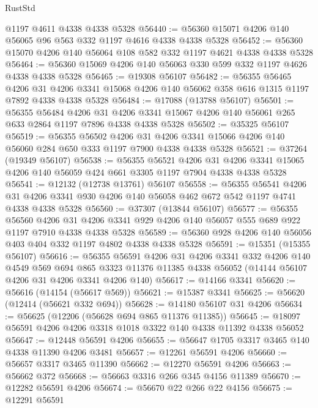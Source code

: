 \begin{lexlean}{RustStd}
\begin{coremodule}
    @1197
    @4611
    @4338
    @4338
    @5328
@56440 := @56360 @15071 @4206 @140 @56065 @96 @563 @332 @1197 @4616 @4338 @4338 @5328
@56452 := @56360 @15070 @4206 @140 @56064 @108 @582 @332 @1197 @4621 @4338 @4338 @5328
@56464 := @56360 @15069 @4206 @140 @56063 @330 @599 @332 @1197 @4626 @4338 @4338 @5328
@56465 := @19308 @56107
@56482 := @56355
    @56465
    @4206
    @31
    @4206
    @3341
    @15068
    @4206
    @140
    @56062
    @358
    @616
    @1315
    @1197
    @7892
    @4338
    @4338
    @5328
@56484 := @17088 (@13788 @56107)
@56501 := @56355
    @56484
    @4206
    @31
    @4206
    @3341
    @15067
    @4206
    @140
    @56061
    @265
    @633
    @2864
    @1197
    @7896
    @4338
    @4338
    @5328
@56502 := @35325 @56107
@56519 := @56355
    @56502
    @4206
    @31
    @4206
    @3341
    @15066
    @4206
    @140
    @56060
    @284
    @650
    @333
    @1197
    @7900
    @4338
    @4338
    @5328
@56521 := @37264 (@19349 @56107)
@56538 := @56355
    @56521
    @4206
    @31
    @4206
    @3341
    @15065
    @4206
    @140
    @56059
    @424
    @661
    @3305
    @1197
    @7904
    @4338
    @4338
    @5328
@56541 := @12132 (@12738 @13761) @56107
@56558 := @56355
    @56541
    @4206
    @31
    @4206
    @3341
    @930
    @4206
    @140
    @56058
    @462
    @672
    @542
    @1197
    @4741
    @4338
    @4338
    @5328
@56560 := @37307 (@13844 @56107)
@56577 := @56355
    @56560
    @4206
    @31
    @4206
    @3341
    @929
    @4206
    @140
    @56057
    @555
    @689
    @922
    @1197
    @7910
    @4338
    @4338
    @5328
@56589 := @56360 @928 @4206 @140 @56056 @403 @404 @332 @1197 @4802 @4338 @4338 @5328
@56591 := @15351 (@15355 @56107)
@56616 := @56355
    @56591
    @4206
    @31
    @4206
    @3341
    @332
    @4206
    @140
    @4549
    @569
    @694
    @865
    @3323
    @11376
    @11385
    @4338
    @56052
    (@14144 @56107 @4206 @31 @4206 @3341 @4206 @140)
@56617 := @14166 @3341
@56620 := @56616 (@14154 (@56617 @569))
@56621 := @15387 @3341
@56625 := @56620 (@12414 (@56621 @332 @694))
@56628 := @14180 @56107 @31 @4206
@56634 := @56625 (@12206 (@56628 @694 @865 @11376 @11385))
@56645 := @18097 @56591 @4206 @4206 @3318 @1018 @3322 @140 @4338 @11392 @4338 @56052
@56647 := @12448 @56591 @4206
@56655 := @56647 @1705 @3317 @3465 @140 @4338 @11390 @4206 @3481
@56657 := @12261 @56591 @4206
@56660 := @56657 @3317 @3465 @11390
@56662 := @12270 @56591 @4206
@56663 := @56662 @372
@56668 := @56663 @3316 @266 @345 @4156 @11389
@56670 := @12282 @56591 @4206
@56674 := @56670 @22 @266 @22 @4156
@56675 := @12291 @56591

\end{coremodule}
\end{lexlean}
